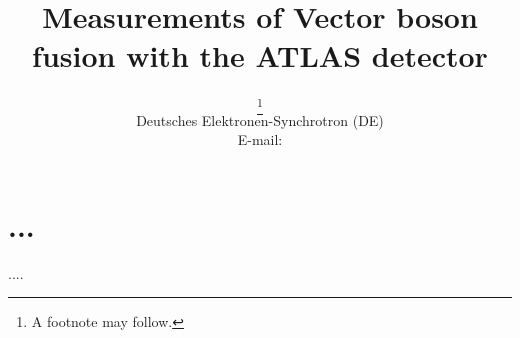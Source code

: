 \documentclass{PoS}
\title{Measurements of Vector boson fusion with the ATLAS detector}
\author{\speaker{Kurt Brendlinger}%
        \thanks{A footnote may follow.}\\
       Deutsches Elektronen-Synchrotron (DE)\\
       E-mail: \email{kurt.brendlinger@cern.ch}}
\begin{document}
\section{...}


\begin{thebibliography}{99}
  ....
\end{thebibliography}
\end{document}
